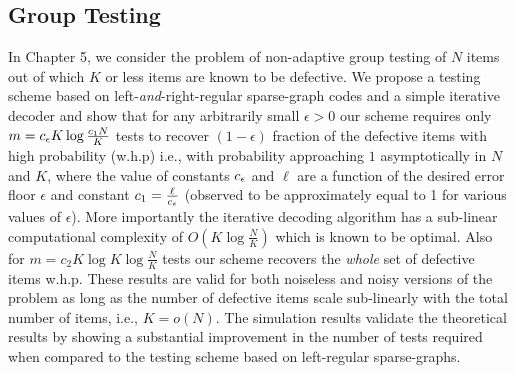 \subsection*{Group Testing}
In Chapter 5, we consider the problem of non-adaptive group testing of $N$ items out of which $K$ or less items are known to be defective. We propose a testing scheme based on left-{\em and}-right-regular sparse-graph codes and a simple iterative decoder and show that for any arbitrarily small $\epsilon>0$ our scheme requires only $m=c_{\epsilon} K\log \frac{c_1N}{K}$ tests to recover $(1-\epsilon)$ fraction of the defective items with high probability (w.h.p) i.e., with probability approaching $1$ asymptotically in $N$ and $K$, where the value of constants $c_{\epsilon}$ and $\ell$ are a function of the desired error floor $\epsilon$ and constant $c_1=\frac{\ell}{c_{\epsilon}}$ (observed to be approximately equal to 1 for various values of $\epsilon$). More importantly the iterative decoding algorithm has a sub-linear computational complexity of $O(K\log \frac{N}{K})$ which is known to be optimal. Also for $m=c_2 K\log K\log \frac{N}{K}$ tests our scheme recovers the \textit{whole} set of defective items w.h.p. These results are valid for both noiseless and noisy versions of the problem as long as the number of defective items scale sub-linearly with the total number of items, i.e., $K=o(N)$. The simulation results validate the theoretical results by showing a substantial improvement in the number of tests required when compared to the testing scheme based on left-regular sparse-graphs.


